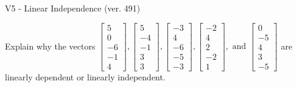 \begin{exercise}
  \begin{exerciseTitle}V5 - Linear Independence (ver. 491)\end{exerciseTitle}
  \begin{exerciseStatement}
    Explain why the vectors \(\left[\begin{array}{r}
5 \\
0 \\
-6 \\
-1 \\
4
\end{array}\right] , \left[\begin{array}{r}
5 \\
-4 \\
-1 \\
3 \\
3
\end{array}\right] , \left[\begin{array}{r}
-3 \\
4 \\
-6 \\
-5 \\
-3
\end{array}\right] , \left[\begin{array}{r}
-2 \\
4 \\
2 \\
-2 \\
1
\end{array}\right] , \text{ and } \left[\begin{array}{r}
0 \\
-5 \\
4 \\
3 \\
-5
\end{array}\right]\) are linearly dependent or linearly independent.	



\end{exerciseStatement}
\end{exercise}
